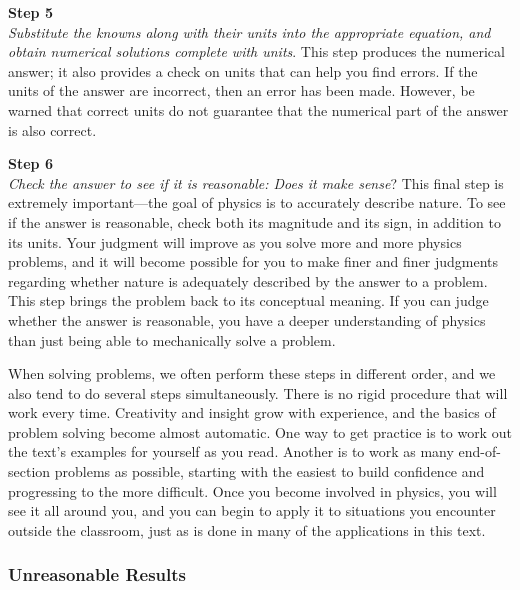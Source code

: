 \documentclass[main-ap-physics.tex]{subfiles}
\begin{document}
\vspace{1em}

\textbf{Step 5}\\
\textit{Substitute the knowns along with their units into the appropriate equation, and obtain numerical solutions complete with units}. This step produces the numerical answer; it also provides a check on units that can help you find errors. If the units of the answer are incorrect, then an error has been made. However, be warned that correct units do not guarantee that the numerical part of the answer is also correct.

\vspace{1em}

\textbf{Step 6}\\
\textit{Check the answer to see if it is reasonable: Does it make sense}? This final step is extremely important---the goal of physics is to accurately describe nature. To see if the answer is reasonable, check both its magnitude and its sign, in addition to its units. Your judgment will improve as you solve more and more physics problems, and it will become possible for you to make finer and finer judgments regarding whether nature is adequately described by the answer to a problem. This step brings the problem back to its conceptual meaning. If you can judge whether the answer is reasonable, you have a deeper understanding of physics than just being able to mechanically solve a problem.

\vspace{1em}

When solving problems, we often perform these steps in different order, and we also tend to do several steps simultaneously. There is no rigid procedure that will work every time. Creativity and insight grow with experience, and the basics of problem solving become almost automatic. One way to get practice is to work out the text's examples for yourself as you read. Another is to work as many end-of-section problems as possible, starting with the easiest to build confidence and progressing to the more difficult. Once you become involved in physics, you will see it all around you, and you can begin to apply it to situations you encounter outside the classroom, just as is done in many of the applications in this text.

\subsubsection*{Unreasonable Results}
\end{document}
